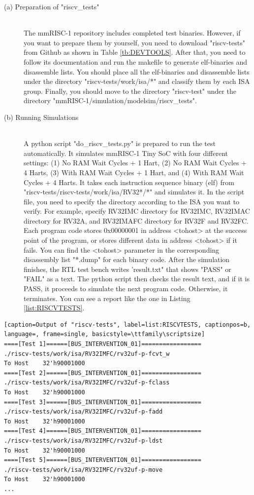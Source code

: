 \begin{description}

    \item[(a) Preparation of "riscv\_tests"]\mbox{}\\
The mmRISC-1 repository includes completed test binaries. However, if you want to prepare them by yourself, you need to download "riscv-tests" from Github as shown in Table \ref{tb:DEVTOOLS}. After that, you need to follow its documentation and run the makefile to generate elf-binaries and disassemble lists. You should place all the elf-binaries and disassemble lists under the directory "riscv-tests/work/isa/*" and classify them by each ISA group. Finally, you should move to the directory "riscv-test" under the directory "mmRISC-1/simulation/modelsim/riscv\_tests".

    \item[(b) Running Simulations]\mbox{}\\
A python script "do\_riscv\_tests.py" is prepared to run the test automatically. It simulates mmRISC-1 Tiny SoC with four different settings: (1) No RAM Wait Cycles + 1 Hart, (2) No RAM Wait Cycles + 4 Harts, (3) With RAM Wait Cycles + 1 Hart, and (4) With RAM Wait Cycles + 4 Harts. It takes each instruction sequence binary (elf) from "riscv-tests/riscv-tests/work/isa/RV32*/*" and simulates it. In the script file, you need to specify the directory according to the ISA you want to verify. For example, specify RV32IMC directory for RV32IMC, RV32IMAC directory for RV32A, and RV32IMAFC directory for RV32F and RV32FC. Each program code stores 0x00000001 in address <tohost> at the success point of the program, or stores different data in address <tohost> if it fails. You can find the <tohost> parameter in the corresponding disassembly list "*.dump" for each binary code. After the simulation finishes, the RTL test bench writes 'result.txt" that shows "PASS" or "FAIL" as a text. The python script then checks the result text, and if it is PASS, it proceeds to simulate the next program code. Otherwise, it terminates. You can see a report like the one in Listing \ref{list:RISCVTESTS}.

\end{description}

\begin{lstlisting}[caption=Output of "riscv-tests", label=list:RISCVTESTS, captionpos=b,  language=, frame=single, basicstyle=\ttfamily\scriptsize]
====[Test 1]======[BUS_INTERVENTION_01]=================
./riscv-tests/work/isa/RV32IMFC/rv32uf-p-fcvt_w
To Host    32'h90001000
====[Test 2]======[BUS_INTERVENTION_01]=================
./riscv-tests/work/isa/RV32IMFC/rv32uf-p-fclass
To Host    32'h90001000
====[Test 3]======[BUS_INTERVENTION_01]=================
./riscv-tests/work/isa/RV32IMFC/rv32uf-p-fadd
To Host    32'h90001000
====[Test 4]======[BUS_INTERVENTION_01]=================
./riscv-tests/work/isa/RV32IMFC/rv32uf-p-ldst
To Host    32'h90001000
====[Test 5]======[BUS_INTERVENTION_01]=================
./riscv-tests/work/isa/RV32IMFC/rv32uf-p-move
To Host    32'h90001000
...
\end{lstlisting}




